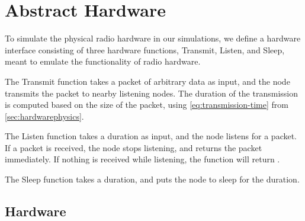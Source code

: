 \section{Abstract Hardware}\label{sec:interface}
To simulate the physical radio hardware in our simulations, we define a hardware interface consisting of three
hardware functions, Transmit, Listen, and Sleep, meant to emulate the functionality of radio hardware. 

%



\begin{description}[style=nextline,font=\normalfont]
    \item[Transmit(\textit{packet})] The Transmit function takes a packet of arbitrary data as input, and the
          node transmits the packet to nearby listening nodes. The duration of the transmission is computed
          based on the size of the packet, using \autoref{eq:transmission-time} from
          \autoref{sec:hardwarephysics}.
    \item[Listen(\textit{duration})] The Listen function takes a duration as input, and the node listens for a
          packet. If a packet is received, the node stops listening, and returns the packet immediately. If
          nothing is received while listening, the function will return \KwNull. 
    \item[Sleep(\textit{duration})] The Sleep function takes a duration, and puts the node to sleep for the
          duration. 
\end{description}

\subsection{Hardware}\label{sec:hardwarephysics}

